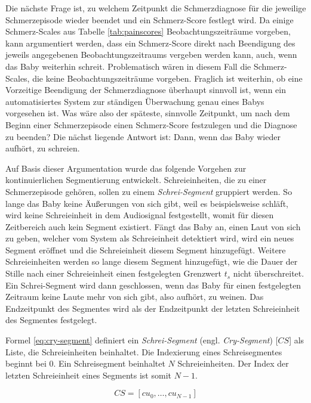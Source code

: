 Die nächste Frage ist, zu welchem Zeitpunkt die Schmerzdiagnose für die jeweilige Schmerzepisode wieder beendet und ein Schmerz-Score festlegt wird. Da einige Schmerz-Scales aus Tabelle \ref{tab:painscores} Beobachtungszeiträume vorgeben, kann argumentiert werden, dass ein Schmerz-Score direkt nach Beendigung des jeweils angegebenen Beobachtungszeitraums vergeben werden kann, auch, wenn das Baby weiterhin schreit. Problematisch wären in diesem Fall die Schmerz-Scales, die keine Beobachtungszeiträume vorgeben. Fraglich ist weiterhin, ob eine Vorzeitige Beendigung der Schmerzdiagnose überhaupt sinnvoll ist, wenn ein automatisiertes System zur ständigen Überwachung genau eines Babys vorgesehen ist. Was wäre also der späteste, sinnvolle Zeitpunkt, um nach dem Beginn einer Schmerzepisode einen Schmerz-Score festzulegen und die Diagnose zu beenden? Die nächst liegende Antwort ist: Dann, wenn das Baby wieder aufhört, zu schreien.

Auf Basis dieser Argumentation wurde das folgende Vorgehen zur kontinuierlichen Segmentierung entwickelt. Schreieinheiten, die zu einer Schmerzepisode gehören, sollen zu einem \emph{Schrei-Segment} gruppiert werden. So lange das Baby keine Äußerungen von sich gibt, weil es beispielsweise schläft, wird keine Schreieinheit in dem Audiosignal festgestellt, womit für diesen Zeitbereich auch kein Segment existiert. Fängt das Baby an, einen Laut von sich zu geben, welcher vom System als Schreieinheit detektiert wird, wird ein neues Segment eröffnet und die Schreieinheit diesem Segment hinzugefügt. Weitere Schreieinheiten werden so lange diesem Segment hinzugefügt, wie die Dauer der Stille nach einer Schreieinheit einen festgelegten Grenzwert $t_{s}$ nicht überschreitet. Ein Schrei-Segment wird dann geschlossen, wenn das Baby für einen festgelegten Zeitraum keine Laute mehr von sich gibt, also \glqq aufhört, zu weinen\grqq{}. Das Endzeitpunkt des Segmentes wird als der Endzeitpunkt der letzten Schreieinheit des Segmentes festgelegt.

Formel \ref{eq:cry-segment} definiert ein \emph{Schrei-Segment} (engl. \emph{Cry-Segment}) [$CS$] als Liste, die Schreieinheiten beinhaltet. Die Indexierung eines Schreisegmentes beginnt bei $0$. Ein Schreisegment beinhaltet $N$ Schreieinheiten. Der Index der letzten Schreieinheit eines Segments ist somit $N-1$.

\begin{equation}
CS = [cu_0 ,  \ldots,  cu_{N-1}]
\label{eq:cry-segment}
\end{equation}

